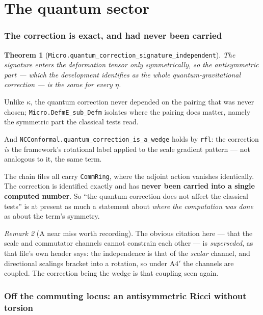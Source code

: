 \documentclass[11pt,a4paper]{article}
\newtheorem{theorem}{Theorem}[section]
\theoremstyle{definition}
\theoremstyle{remark}
\newtheorem{remark}[theorem]{Remark}
\newcommand{\lean}[1]{\texttt{\small #1}}
\newcommand{\Afour}{\ensuremath{\mathrm{A4}'}}
\begin{document}
\part{The quantum sector}

\section{The correction is exact, and had never been carried}
\label{sec:micro}

\begin{theorem}[\lean{Micro.quantum\_correction\_signature\_independent}]
The signature enters the deformation tensor only \emph{symmetrically}, so the
antisymmetric part --- which the development identifies as the whole
quantum-gravitational correction --- is the same for every $\eta$.
\end{theorem}

Unlike $\kappa$, the quantum correction never depended on the pairing that was
never chosen; \lean{Micro.DefmE\_sub\_Defm} isolates where the pairing does matter,
namely the symmetric part the classical tests read.

And \lean{NCConformal.quantum\_correction\_is\_a\_wedge} holds by \lean{rfl}: the
correction \emph{is} the framework's rotational label applied to the scale gradient
pattern --- not analogous to it, the same term.

\begin{claimbox}
The chain files all carry \lean{CommRing}, where the adjoint action vanishes
identically. The correction is identified exactly and has \textbf{never been
carried into a single computed number}. So ``the quantum correction does not affect
the classical tests'' is at present as much a statement about \emph{where the
computation was done} as about the term's symmetry.
\end{claimbox}

\begin{remark}[A near miss worth recording]
The obvious citation here --- that the scale and commutator channels cannot
constrain each other --- is \emph{superseded}, as that file's own header says: the
independence is that of the \emph{scalar} channel, and directional scalings bracket
into a rotation, so under \Afour{} the channels are coupled. The correction being
the wedge is that coupling seen again.
\end{remark}

\section{Off the commuting locus: an antisymmetric Ricci without torsion}
\label{sec:quantum}
\end{document}

